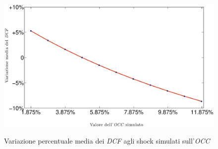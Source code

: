 \begin{figure}[htbp]
\begin{center}
{\includegraphics[scale=0.40]{Grafici/Terzo/varocc.eps}}
\caption[Variazione media \% dei \textit{DCF} vs $\Delta$ \textit{OCC}]{Variazione percentuale media dei \textit{DCF} agli shock simulati sull'\textit{OCC}}
\label{graf:varocc}
\end{center}
\end{figure}